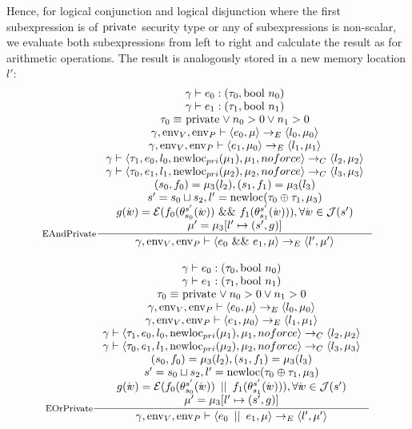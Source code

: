 \documentclass[a4paper, 10pt, draft]{report}
\DeclareMathOperator*{\env}{env}
\DeclareMathOperator*{\newloc}{newloc}
\newcommand{\mycode}[1]{\ensuremath{\mbox{\lstinline{#1}}}}
\begin{document}
Hence, for logical conjunction and logical disjunction where the first
subexpression is of \mycode{private} security type or any of subexpressions is
non-scalar, we evaluate both subexpressions from left to right and calculate
the result as for arithmetic operations. The result is analogously stored in a
new memory location $l'$:
\[\begin{array}{c}
\inference[EAndPrivate]{
  \gamma |- e_0 : (\tau_0, \mycode{bool}\ n_0) \\
  \gamma |- e_1 : (\tau_1, \mycode{bool}\ n_1) \\
  \tau_0 \equiv \mycode{private} \lor n_0 > 0 \lor n_1 > 0 \\
  \gamma, \env_V, \env_P |- \left<e_0, \mu \right> \to_E \left<l_0, \mu_0 \right> \\
  \gamma, \env_V, \env_P |- \left<e_1, \mu_0 \right> \to_E \left<l_1, \mu_1 \right> \\
  \gamma |- \left<\tau_1, e_0, l_0, \newloc_{pri}(\mu_1), \mu_1, noforce \right> \to_C \left<l_2, \mu_2 \right> \\
  \gamma |- \left<\tau_0, e_1, l_1, \newloc_{pri}(\mu_2), \mu_2, noforce \right> \to_C \left<l_3, \mu_3 \right> \\
  (s_0,f_0) = \mu_3(l_2), (s_1,f_1) = \mu_3(l_3) \\
  s' = s_0 \sqcup s_2, l' = \newloc(\tau_0 \oplus \tau_1, \mu_3) \\
  g(i\!v) = \mathcal{E}(f_0(\theta_{s_0}^{s'}(i\!v))\ \mycode{&&}\ f_1(\theta_{s_1}^{s'}(i\!v))), \forall i\!v \in \mathcal{J}(s') \\
  \mu' = \mu_3[l' \mapsto (s',g)]
}{
  \gamma, \env_V, \env_P |- \left<e_0\ \mycode{&&}\ e_1, \mu \right> \to_E \left<l', \mu' \right>
}\\[2em]
\inference[EOrPrivate]{
  \gamma |- e_0 : (\tau_0, \mycode{bool}\ n_0) \\
  \gamma |- e_1 : (\tau_1, \mycode{bool}\ n_1) \\
  \tau_0 \equiv \mycode{private} \lor n_0 > 0 \lor n_1 > 0 \\
  \gamma, \env_V, \env_P |- \left<e_0, \mu \right> \to_E \left<l_0, \mu_0 \right> \\
  \gamma, \env_V, \env_P |- \left<e_1, \mu_0 \right> \to_E \left<l_1, \mu_1 \right> \\
  \gamma |- \left<\tau_1, e_0, l_0, \newloc_{pri}(\mu_1), \mu_1, noforce \right> \to_C \left<l_2, \mu_2 \right> \\
  \gamma |- \left<\tau_0, e_1, l_1, \newloc_{pri}(\mu_2), \mu_2, noforce \right> \to_C \left<l_3, \mu_3 \right> \\
  (s_0,f_0) = \mu_3(l_2), (s_1,f_1) = \mu_3(l_3) \\
  s' = s_0 \sqcup s_2, l' = \newloc(\tau_0 \oplus \tau_1, \mu_3) \\
  g(i\!v) = \mathcal{E}(f_0(\theta_{s_0}^{s'}(i\!v))\ \mycode{||}\ f_1(\theta_{s_1}^{s'}(i\!v))), \forall i\!v \in \mathcal{J}(s') \\
  \mu' = \mu_3[l' \mapsto (s',g)]
}{
  \gamma, \env_V, \env_P |- \left<e_0\ \mycode{||}\ e_1, \mu \right> \to_E \left<l', \mu' \right>
}
\end{array}\]
\end{document}
